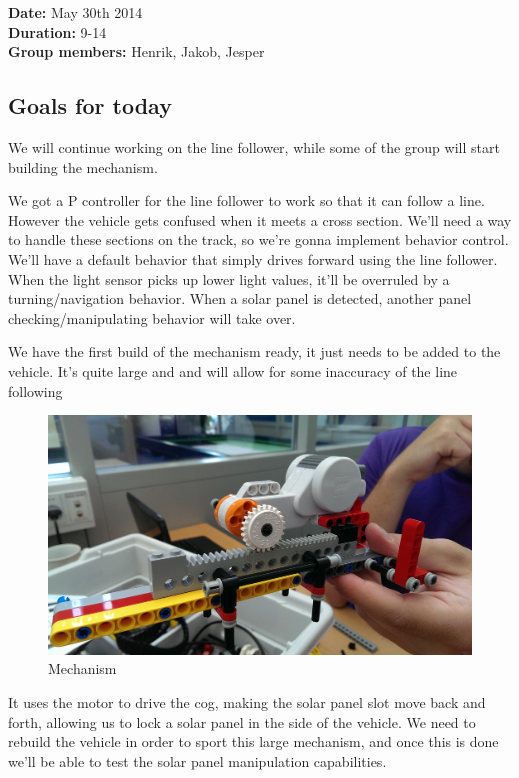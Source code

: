 \textbf{Date:} May 30th 2014\\\textbf{Duration:} 9-14\\\textbf{Group
members:} Henrik, Jakob, Jesper

\subsection{Goals for today}

We will continue working on the line follower, while some of the group
will start building the mechanism.

We got a P controller for the line follower to work so that it can
follow a line. However the vehicle gets confused when it meets a cross
section. We'll need a way to handle these sections on the track, so
we're gonna implement behavior control.\\We'll have a default behavior
that simply drives forward using the line follower. When the light
sensor picks up lower light values, it'll be overruled by a
turning/navigation behavior. When a solar panel is detected, another
panel checking/manipulating behavior will take over.

We have the first build of the mechanism ready, it just needs to be
added to the vehicle. It's quite large and and will allow for some
inaccuracy of the line following
\begin{figure}[hbt]
  \centering
  \includegraphics[scale=0.1]{../experiments/images/mekanisme.jpg}

\caption{Mechanism}
\end{figure}

It uses the motor to drive the cog, making the solar panel slot move
back and forth, allowing us to lock a solar panel in the side of the
vehicle. We need to rebuild the vehicle in order to sport this large
mechanism, and once this is done we'll be able to test the solar panel
manipulation capabilities.

